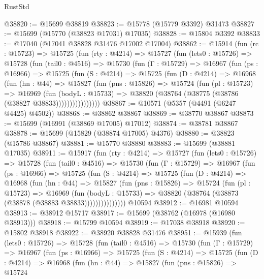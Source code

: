 \begin{lexlean}{RustStd}
\begin{coremodule}
@38820 := @15699 @38819
@38823 := @15778 (@15779 @3392) @31473
@38827 := @15699 (@15770 (@38823 @17031) @17035)
@38828 := @15804 @3392
@38833 := @17040 (@17041 @38828 @31476 @17002 @17004)
@38862 := @15914
    (fun (rc : @15723) =>
    @15725
      (fun (rty : @4214) =>
      @15727
        (fun (lets0 : @15726) =>
        @15728
          (fun (tail0 : @4516) =>
          @15730
            (fun (Γ : @15729) =>
            @16967
              (fun (ps : @16966) =>
              @15725
                (fun (S : @4214) =>
                @15725
                  (fun (D : @4214) =>
                  @16968
                    (fun (hn : @44) =>
                    @15827
                      (fun (pns : @15826) =>
                      @15724
                        (fun (pl : @15723) =>
                        @16969
                          (fun (bodyL : @15733) =>
                          @38820 (@38764 (@38775 (@38786 (@38827 @38833))))))))))))))))
@38867 := @10571 (@5357 (@4491 (@6247 @4425) @4502))
@38868 := @38862 @38867
@38869 := @38770 @38867
@38873 := @15699 (@16991 (@38869 @17005) @17012)
@38874 := @38781 @38867
@38878 := @15699 (@15829 (@38874 @17005) @4376)
@38880 := @38823 (@15786 @38867)
@38881 := @15770 @38880
@38883 := @15699 (@38881 @17035)
@38911 := @15917
    (fun (rty : @4214) =>
    @15727
      (fun (lets0 : @15726) =>
      @15728
        (fun (tail0 : @4516) =>
        @15730
          (fun (Γ : @15729) =>
          @16967
            (fun (ps : @16966) =>
            @15725
              (fun (S : @4214) =>
              @15725
                (fun (D : @4214) =>
                @16968
                  (fun (hn : @44) =>
                  @15827
                    (fun (pns : @15826) =>
                    @15724
                      (fun (pl : @15723) =>
                      @16969
                        (fun (bodyL : @15733) =>
                        @38820 (@38764 (@38873 (@38878 (@38883 @38833)))))))))))))))
    @10594
@38912 := @16981 @10594
@38913 := @38912 @15717
@38917 := @15699 (@38762 (@16978 (@16980 @38913)))
@38918 := @15799 @10594
@38919 := @17038 @38918
@38920 := @15802 @38918
@38922 := @38920 @38828 @31476
@38951 := @15939
    (fun (lets0 : @15726) =>
    @15728
      (fun (tail0 : @4516) =>
      @15730
        (fun (Γ : @15729) =>
        @16967
          (fun (ps : @16966) =>
          @15725
            (fun (S : @4214) =>
            @15725
              (fun (D : @4214) =>
              @16968
                (fun (hn : @44) =>
                @15827
                  (fun (pns : @15826) =>
                  @15724

\end{coremodule}
\end{lexlean}
